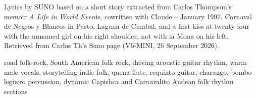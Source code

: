 
\begin{notes}
Lyrics by SUNO based on a short story extracted from Carlos Thompson's memoir \emph{A Life in World Events}, cowritten with Claude -- January 1997, Carnaval de Negros y Blancos in Pasto, Laguna de Cumbal, and a first kiss at twenty-four with the unnamed girl on his right shoulder, not with la Mona on his left. Retrieved from Carlos Th's Suno page (V6-MINI, 26 September 2026).
\end{notes}
\begin{style}
road folk-rock, South American folk rock, driving acoustic guitar rhythm, warm male vocals, storytelling indie folk, quena flute, requinto guitar, charango, bombo legüero percussion, dynamic Capishca and Carnavalito Andean folk rhythm sections
\end{style}
